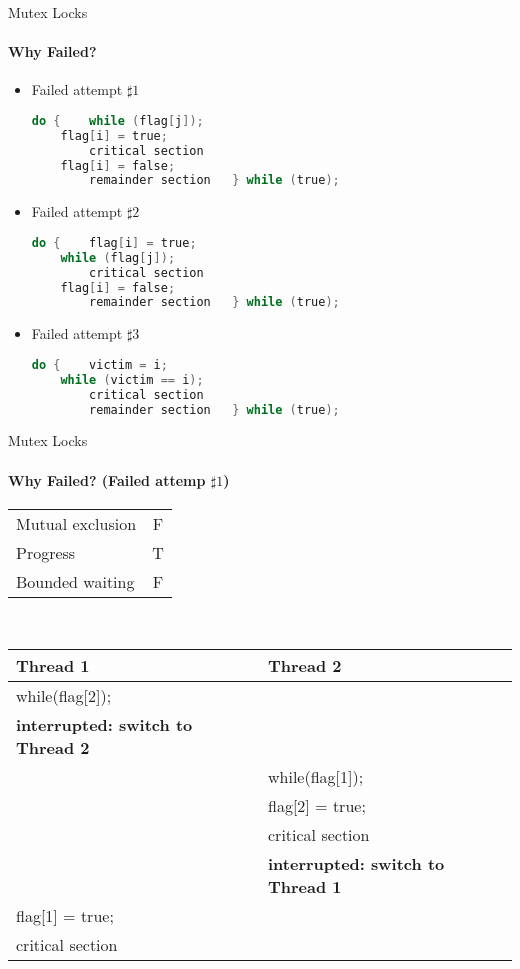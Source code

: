 \documentclass[10pt]{beamer}
\begin{document}
\begin{frame}[fragile]{Mutex Locks}
\framesubtitle{Why Failed?}
\begin{itemize}
 
\item Failed attempt $\sharp 1$
\vspace{2pt}\\
\begin{lstlisting}[language=C]
do {	while (flag[j]);
	flag[i] = true;
		critical section
	flag[i] = false;
		remainder section	} while (true);
\end{lstlisting}
\item Failed attempt $\sharp 2$
\vspace{2pt}\\
\begin{uncoverenv}
\begin{lstlisting}[language=C]
do {	flag[i] = true;
	while (flag[j]);
		critical section
	flag[i] = false;
		remainder section	} while (true);
\end{lstlisting}
\end{uncoverenv}
\item Failed attempt $\sharp 3$
\vspace{2pt}\\
\begin{uncoverenv}
\begin{lstlisting}[language=C]
do {	victim = i;
	while (victim == i);
		critical section
		remainder section	} while (true);
\end{lstlisting}
\end{uncoverenv}
\end{itemize}
\end{frame}

\begin{frame}{Mutex Locks}
\framesubtitle{Why Failed? (Failed attemp $\sharp 1$)}
\scriptsize
\begin{tabular}{|l|c|}
\hline
Mutual exclusion & F\\
Progress & T\\
Bounded waiting & F\\
\hline
\end{tabular}
\\
\vspace{2em}
\centering
\begin{tabular}{l l}
\textbf{Thread 1}&\textbf{Thread 2}\\
\hline
while(flag[2]); &\\
\textbf{interrupted: switch to Thread 2}&\\
& while(flag[1]); \\
& flag[2] = true; \\
& critical section \\
& \textbf{interrupted: switch to Thread 1}\\
flag[1] = true; &\\
critical section &\\
\end{tabular}
\end{frame}
\end{document}
